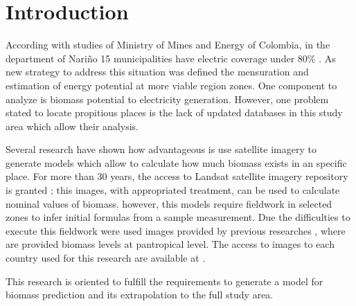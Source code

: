 \section{Introduction} 

\IEEEPARstart According with studies of Ministry of Mines and Energy of Colombia, in the department of Nariño 15 municipalities have electric coverage under 80\% \cite{ministerio_de_minas_y_energia_plan_2008}. As new strategy to address this situation was defined the mensuration and estimation of energy potential at more viable region zones. One component to analyze is biomass potential to electricity generation. However, one problem stated to locate propitious places is the lack of updated databases in this study area which allow their analysis.

Several research have shown how advantageous is use satellite imagery to generate models which allow to calculate how much biomass exists in an specific place. For more than 30 years, the access to Landsat satellite imagery repository is granted \cite{landsat}; this images, with appropriated treatment, can be used to calculate nominal values of biomass. however, this models require fieldwork in selected zones to infer initial formulas from a sample measurement. Due the difficulties  to execute this fieldwork were used images provided by previous researches \cite{baccini2008afirst}, \cite{baccini_estimated_2012} where are provided biomass levels at pantropical level. The access to images to each country used for this research are available at \cite{WHRC}.

This research is oriented to fulfill the requirements to generate a model for biomass prediction and its extrapolation to the full study area.